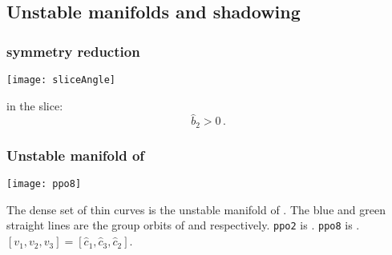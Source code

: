\subsection{Unstable manifolds and shadowing}

\begin{frame}
  \frametitle{ symmetry reduction}
  \putsymf

  \begin{center}
    \texttt{[image: sliceAngle]}
  \end{center}

   in the slice:
  \begin{equation}
    \label{eq:fundDomain}
    \hat{b}_2 > 0
    \,.
  \end{equation}
  

\end{frame}

\begin{frame}%
  \frametitle{Unstable manifold of }
  
  {\centering
    \texttt{[image: ppo8]}
  \par}
  { \scriptsize 
    The dense set of thin curves is the unstable
    manifold of .  The blue and green straight lines are the group orbits of
     and  respectively. 
    \texttt{ppo2} is .
    \texttt{ppo8} is .
    $[v_1, v_2, v_3] = [\hat{c}_1, \hat{c}_3, \hat{c}_2]$. 
  }
  
\end{frame}



